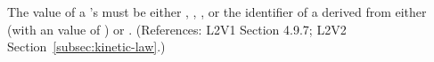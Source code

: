 The value of a \KineticLaw's  must be either
, , , or the identifier of a
\UnitDefinition derived from either  (with an
 value of ) or .
(References: L2V1 Section 4.9.7; L2V2 Section~\ref{subsec:kinetic-law}.)
